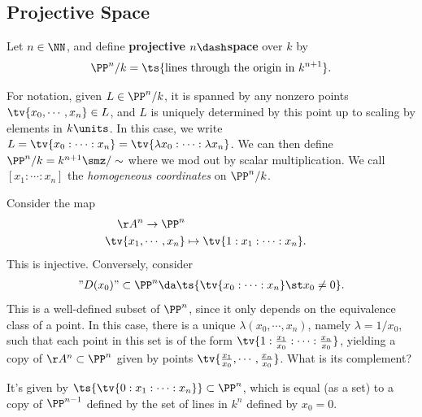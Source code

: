 \hypertarget{projective-space}{%
\subsection{Projective Space}\label{projective-space}}

\begin{definition}

Let \(n\in \NN\), and define \textbf{projective \(n\dash\)space} over
\(k\) by\\
\begin{align*}  
\PP^n/k = \ts{\text{lines through the origin in } k^{n+1}}
.\end{align*}

\end{definition}

\begin{remark}

For notation, given \(L\in \PP^n/k\), it is spanned by any nonzero
points \(\tv{x_0, \cdots, x_n} \in L\), and \(L\) is uniquely determined
by this point up to scaling by elements in \(k\units\). In this case, we
write
\(L = \tv{x_0: \cdots : x_n} = \tv{\lambda x_0: \cdots : \lambda x_n}\).
We can then define \(\PP^n/k = k^{n+1}\smz / \sim\) where we mod out by
scalar multiplication. We call \([x_1 : \cdots : x_n]\) the
\emph{homogeneous coordinates} on \(\PP^n/k\).

\end{remark}

\begin{remark}

Consider the map
\begin{align*}  
\AA^n \to \PP^n \\
\tv{x_1, \cdots, x_n} &\mapsto \tv{1: x_1 : \cdots : x_n}
.\end{align*} This is injective. Conversely, consider
\begin{align*}  
"D(x_0)" \subset \PP^n \da \ts{\tv{x_0 : \cdots : x_n} \st x_0\neq 0}
.\end{align*} This is a well-defined subset of \(\PP^n\), since it only
depends on the equivalence class of a point. In this case, there is a
unique \(\lambda(x_0, \cdots, x_n)\), namely \(\lambda = 1/x_0\), such
that each point in this set is of the form
\(\tv{1: {x_1\over x_0} : \cdots : {x_n \over x_0}}\), yielding a copy
of \(\AA^n\subset \PP^n\) given by points
\(\tv{{x_1\over x_0}, \cdots, {x_n\over x_0}}\). What is its complement?

It's given by \(\ts{\tv{0: x_1: \cdots : x_n}} \subset \PP^n\), which is
equal (as a set) to a copy of \(\PP^{n-1}\) defined by the set of lines
in \(k^n\) defined by \(x_0 = 0\).

\end{remark}

